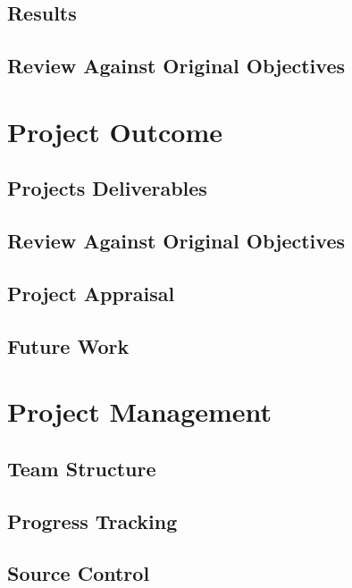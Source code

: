 \documentclass[12pt,a4paper,twoside]{report}
\begin{document}
	\section{Results}
	\section{Review Against Original Objectives}

\chapter{Project Outcome}
	\section{Projects Deliverables}
	\section{Review Against Original Objectives}
	\section{Project Appraisal}
	\section{Future Work}

\chapter{Project Management}
	\section{Team Structure}
	\section{Progress Tracking}
	\section{Source Control}
\end{document}
